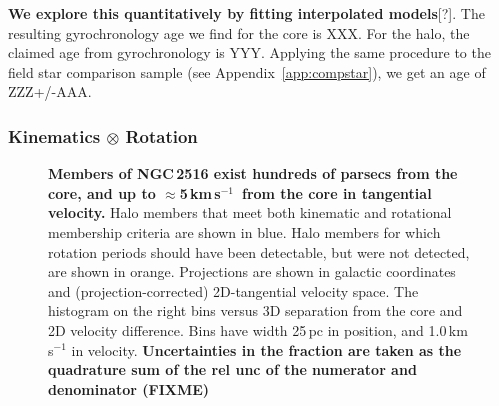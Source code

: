 \documentclass[12pt,twocolumn,tighten]{aastex63}
\newcommand{\kms}{\,km\,s$^{-1}$}
\begin{document}
{\bf We explore this quantitatively by fitting
interpolated models}[?].
The resulting gyrochronology age we find for the core is XXX.
For the halo, the claimed age from gyrochronology is YYY.
Applying the same procedure to the field star comparison sample (see
Appendix~\ref{app:compstar}),
we get an age of ZZZ+/-AAA.

\subsubsection{Kinematics $\otimes$ Rotation}

\begin{figure}[t]
	\begin{center}
	\end{center}
	\vspace{-0.7cm}
  \caption{ 
  {\bf Members of NGC\,2516 exist hundreds of parsecs from the core,
  and up to $\approx$5\kms\ from the core in tangential velocity.}
  Halo members
  that meet both kinematic and rotational membership criteria are shown in
  blue.  Halo members for which rotation periods should have been detectable,
  but were not detected, are shown in orange.  Projections are shown in galactic coordinates and
  (projection-corrected) 2D-tangential velocity space.  The histogram
  on the right bins versus 3D separation from the core and
  2D velocity difference. Bins have width 25\,pc
  in position, and 1.0\,km\,s$^{-1}$ in velocity.  {\bf Uncertainties
  in the fraction are taken as the quadrature sum of the rel unc of
  the numerator and denominator (FIXME)}
  \label{fig:physical_x_rotn}
	}
\end{figure}
\end{document}
